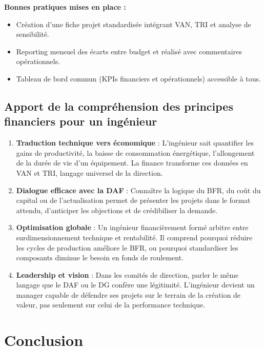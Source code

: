 \documentclass{rapportECL}
\begin{document}
\textbf{Bonnes pratiques mises en place :}
\begin{itemize}
    \item Création d'une fiche projet standardisée intégrant VAN, TRI et analyse de sensibilité.
    \item Reporting mensuel des écarts entre budget et réalisé avec commentaires opérationnels.
    \item Tableau de bord commun (KPIs financiers et opérationnels) accessible à tous.
\end{itemize}

\subsection{Apport de la compréhension des principes financiers pour un ingénieur}

\begin{enumerate}
    \item \textbf{Traduction technique vers économique} : L'ingénieur sait quantifier les gains de productivité, la baisse de consommation énergétique, l'allongement de la durée de vie d'un équipement. La finance transforme ces données en VAN et TRI, langage universel de la direction.
    
    \item \textbf{Dialogue efficace avec la DAF} : Connaître la logique du BFR, du coût du capital ou de l'actualisation permet de présenter les projets dans le format attendu, d'anticiper les objections et de crédibiliser la demande.
    
    \item \textbf{Optimisation globale} : Un ingénieur financièrement formé arbitre entre surdimensionnement technique et rentabilité. Il comprend pourquoi réduire les cycles de production améliore le BFR, ou pourquoi standardiser les composants diminue le besoin en fonds de roulement.
    
    \item \textbf{Leadership et vision} : Dans les comités de direction, parler le même langage que le DAF ou le DG confère une légitimité. L'ingénieur devient un manager capable de défendre ses projets sur le terrain de la création de valeur, pas seulement sur celui de la performance technique.
\end{enumerate}

\section*{Conclusion}
\end{document}

